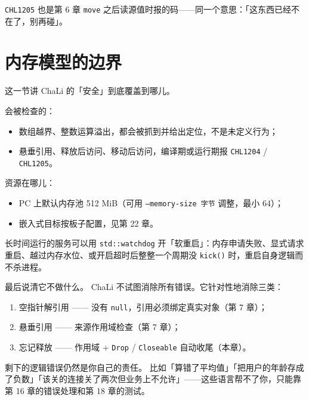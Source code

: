 \texttt{CHL1205} 也是第 6 章 \texttt{move} 之后读源值时报的码——同一个意思：「这东西已经不在了，别再碰」。

\section{内存模型的边界}

这一节讲 ChaLi 的「安全」到底覆盖到哪儿。

会被检查的：

\begin{itemize}

\item 数组越界、整数运算溢出，都会被抓到并给出定位，不是未定义行为；

\item 悬垂引用、释放后访问、移动后访问，编译期或运行期报 \texttt{CHL1204} / \texttt{CHL1205}。

\end{itemize}

资源在哪儿：

\begin{itemize}

\item PC 上默认内存池 512 MiB（可用 \texttt{--memory-size 字节} 调整，最小 64）；

\item 嵌入式目标按板子配置，见第 22 章。

\end{itemize}

长时间运行的服务可以用 \texttt{std:\allowbreak{}:\allowbreak{}watchdog} 开「软重启」：内存申请失败、显式请求重启、越过内存水位、或开启超时后整整一个周期没 \texttt{kick(\allowbreak{})\allowbreak{}} 时，重启自身逻辑而不杀进程。

最后说清它不做什么。 ChaLi 不试图消除所有错误。它针对性地消除三类：

\begin{enumerate}

\item 空指针解引用 —— 没有 \texttt{null}，引用必须绑定真实对象（第 7 章）；

\item 悬垂引用 —— 来源作用域检查（第 7 章）；

\item 忘记释放 —— 作用域 + \texttt{Drop} / \texttt{Closeable} 自动收尾（本章）。

\end{enumerate}

剩下的逻辑错误仍然是你自己的责任。 比如「算错了平均值」「把用户的年龄存成了负数」「该关的连接关了两次但业务上不允许」——这些语言帮不了你，只能靠第 16 章的错误处理和第 18 章的测试。

